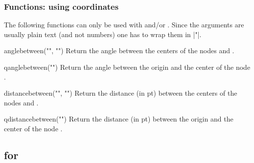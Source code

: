 \begin{multicols}{2}
\subsubsection{Functions: using coordinates}
The following functions can only be used with \pgfname\space and/or \tikzname.
Since the arguments are usually plain text (and not numbers) one has to wrap
them in |"|.
\begin{math-function}{anglebetween("", "")}\mathcommand
  Return the angle between the centers of the nodes  and .
\end{math-function}
\begin{math-function}{qanglebetween("")}\mathcommand
  Return the angle between the origin and the center of the node .
\end{math-function}
\begin{math-function}{distancebetween("", "")}\mathcommand
  Return the distance (in pt) between the centers of the nodes  and .
\end{math-function}
\begin{math-function}{qdistancebetween("")}\mathcommand
  Return the distance (in pt) between the origin and the center of the node .
\end{math-function}

\end{multicols}

\begin{codeexample}[width=6cm,preamble=\usetikzlibrary{calc,ext.misc,through}]
\end{codeexample}

\subsection{\pgfname for}

